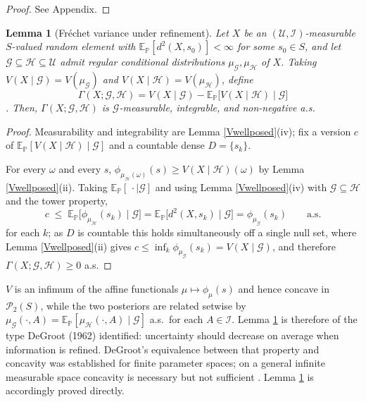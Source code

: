 \documentclass{article}
\newcommand{\E}{\mathbb{E}_{\mathbb{P}}}
\newcommand{\I}{\mathcal{I}}
\newcommand{\U}{\mathcal{U}}
\newcommand{\1}{\mathbbm{1}}
\newtheorem{lemma}{Lemma}
\begin{document}
\begin{proof}
See Appendix.
\end{proof}

\begin{lemma}[Fr\'echet variance under refinement]
\label{masterlemma}
Let $X$ be an $(\U,\I)$-measurable $S$-valued random element with $\E[d^2(X,s_0)]<\infty$ for some
$s_0\in S$, and let $\mathcal{G}\subseteq\mathcal{H}\subseteq\U$ admit regular conditional
distributions $\mu_\mathcal{G},\mu_\mathcal{H}$ of $X$. Taking $V(X\mid\mathcal{G})=V(\mu_\mathcal{G})$ and $V(X\mid\mathcal{H})=V(\mu_\mathcal{H})$, define
\[
\Gamma(X;\mathcal{G},\mathcal{H})=V(X\mid\mathcal{G})-\E\big[V(X\mid\mathcal{H})\mid\mathcal{G}\big]
\]. Then, $\Gamma(X;\mathcal{G},\mathcal{H})$
is $\mathcal{G}$-measurable, integrable, and non-negative a.s.
\end{lemma}

\begin{proof}
Measurability and integrability are Lemma \ref{Vwellposed}(iv); fix a version $c$ of
$\E[V(X\mid\mathcal{H})\mid\mathcal{G}]$ and a countable dense $D=\{s_k\}$.

For every $\omega$ and every $s$, $\phi_{\mu_\mathcal{H}(\omega)}(s)\ge V(X\mid\mathcal{H})(\omega)$
by Lemma \ref{Vwellposed}(ii). Taking $\E[\,\cdot\mid\mathcal{G}]$ and using Lemma
\ref{Vwellposed}(iv) with $\mathcal{G}\subseteq\mathcal{H}$ and the tower property,
\[
c\;\le\;\E\big[\phi_{\mu_\mathcal{H}}(s_k)\mid\mathcal{G}\big]
=\E\big[d^2(X,s_k)\mid\mathcal{G}\big]=\phi_{\mu_\mathcal{G}}(s_k)\qquad\text{a.s.}
\]
for each $k$; as $D$ is countable this holds simultaneously off a single null set, where Lemma
\ref{Vwellposed}(ii) gives $c\le\inf_k\phi_{\mu_\mathcal{G}}(s_k)=V(X\mid\mathcal{G})$, and therefore $\Gamma(X;\mathcal{G},\mathcal{H})\ge0$ a.s.
\end{proof}

$V$ is an infimum of the affine functionals $\mu\mapsto\phi_\mu(s)$ and hence concave in $\mathcal{P}_2(S)$, while the two
posteriors are related setwise by $\mu_\mathcal{G}(\cdot,A)=\E[\mu_\mathcal{H}(\cdot,A)\mid\mathcal{G}]$
a.s.\ for each $A\in\I$. Lemma \ref{masterlemma} is therefore of the type DeGroot (1962) identified:
uncertainty should decrease on average when information is refined. DeGroot's equivalence between
that property and concavity was established for finite parameter spaces; on a general infinite
measurable space concavity is necessary but not sufficient \citep{bect2026}. Lemma \ref{masterlemma}
is accordingly proved directly.
\end{document}
